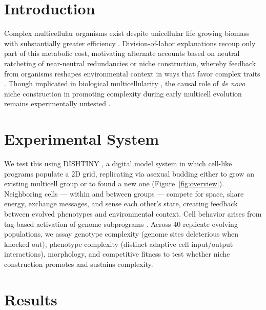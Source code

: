\section{Introduction}

Complex multicellular organisms exist despite unicellular life growing biomass with substantially greater efficiency \citep{lynch2024bioenergetic}.
Division-of-labor explanations \citep{Saunders1976,corning2015synergistic,niklas2014evolutionary,Bell1997} recoup only part of this metabolic cost, motivating alternate accounts based on neutral ratcheting of near-neutral redundancies \citep{Gould1988,lynch2003origins,muozgmez2021constructive} or niche construction, whereby feedback from organisms reshapes environmental context in ways that favor complex traits \citep{odlingsmee2003niche,taylor2004niche,laland2014niche}.
Though implicated in biological multicellularity \citep{niklas2014evolutionary,boraas1998phagotrophy,yoshida2003rapid}, the causal role of \textit{de novo} niche construction in promoting complexity during early multicell evolution remains experimentally untested \citep{goldsby2012task,bozdag2023denovo,ratcliff2012experimental,kalambokidis2023multispecies}.

\section{Experimental System}



We test this using DISHTINY \citep{moreno2019toward}, a digital model system in which cell-like programs populate a 2D grid, replicating via asexual budding either to grow an existing multicell group or to found a new one (Figure~\ref{fig:overview}).
Neighboring cells --- within and between groups --- compete for space, share energy, exchange messages, and sense each other's state, creating feedback between evolved phenotypes and environmental context.
Cell behavior arises from tag-based activation of genome subprograms \citep{lalejini2018evolving,moreno2023matchmaker}.
Across 40 replicate evolving populations, we assay genotype complexity (genome sites deleterious when knocked out), phenotype complexity (distinct adaptive cell input/output interactions), morphology, and competitive fitness to test whether niche construction promotes and sustains complexity.

\section{Results}

